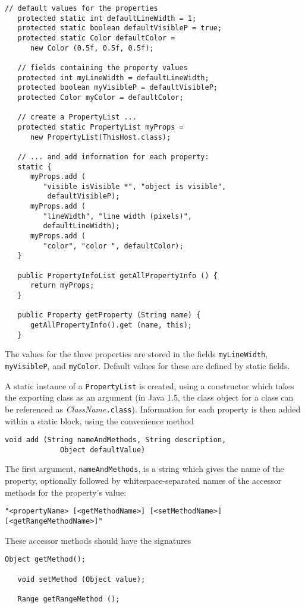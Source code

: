 \begin{lstlisting}[]
   // default values for the properties
   protected static int defaultLineWidth = 1;
   protected static boolean defaultVisibleP = true;
   protected static Color defaultColor = 
      new Color (0.5f, 0.5f, 0.5f);

   // fields containing the property values
   protected int myLineWidth = defaultLineWidth;
   protected boolean myVisibleP = defaultVisibleP;
   protected Color myColor = defaultColor;

   // create a PropertyList ...
   protected static PropertyList myProps = 
      new PropertyList(ThisHost.class);

   // ... and add information for each property:
   static {
      myProps.add (
         "visible isVisible *", "object is visible", 
          defaultVisibleP);
      myProps.add (
         "lineWidth", "line width (pixels)", 
         defaultLineWidth);
      myProps.add (
         "color", "color ", defaultColor);
   }

   public PropertyInfoList getAllPropertyInfo () {
      return myProps;
   }

   public Property getProperty (String name) {
      getAllPropertyInfo().get (name, this);
   }
\end{lstlisting}
The values for the three properties are stored in the fields {\tt myLineWidth}, 
{\tt myVisibleP}, and {\tt myColor}. Default values for
these are defined by static fields.

A static instance of a {\tt PropertyList} is created, using a
constructor which takes the exporting class as an argument (in Java
1.5, the class object for a class can be referenced as 
{\it ClassName}{\tt .class}). Information for each property is
then added within a static block, using the convenience method
\begin{lstlisting}[]
   void add (String nameAndMethods, String description, 
             Object defaultValue)    
\end{lstlisting}
The first argument, {\tt nameAndMethods}, is a string which gives the
name of the property, optionally followed by
whitespace-separated names of the accessor methods for
the property's value:
\begin{lstlisting}[]
   "<propertyName> [<getMethodName>] [<setMethodName>] [<getRangeMethodName>]"    
\end{lstlisting}
These accessor methods should have the
signatures
\begin{lstlisting}[]
   Object getMethod();

   void setMethod (Object value);

   Range getRangeMethod ();
\end{lstlisting}

